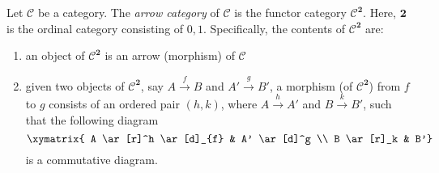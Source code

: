 \documentclass[12pt]{article}
\begin{document}
Let $\mathcal{C}$ be a category.  The \emph{arrow category} of $\mathcal{C}$ is the functor category $\mathcal{C}^\textbf{2}$.  Here, $\textbf{2}$ is the ordinal category consisting of $0,1$.  Specifically, the contents of $\mathcal{C}^\textbf{2}$ are:
\begin{enumerate}
\item an object of $\mathcal{C}^\textbf{2}$ is an arrow (morphism) of $\mathcal{C}$
\item given two objects of $\mathcal{C}^\textbf{2}$, say $A \stackrel{f}{\longrightarrow} B$ and $A' \stackrel{g}{\longrightarrow} B'$, a morphism (of $\mathcal{C}^\textbf{2}$) from $f$ to $g$ consists of an ordered pair $(h,k)$, where $A \stackrel{h}{\longrightarrow} A'$ and $B \stackrel{k}{\longrightarrow} B'$, such that the following diagram
$$\xymatrix{
 A \ar[r]^h \ar[d]_{f} & A' \ar[d]^g \\ 
 B \ar[r]_k & B'}
$$
is a commutative diagram.
\end{enumerate}
\end{document}
